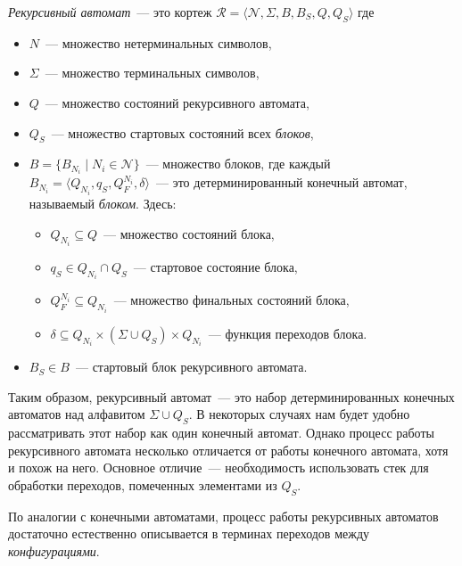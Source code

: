 \begin{definition}
    \emph{Рекурсивный автомат}~--- это кортеж $\mathcal{R} = \langle \mathcal{N},\Sigma,B,B_S,Q,Q_S\rangle$ где
    \begin{itemize}
        \item $N$~--- множество нетерминальных символов,
        \item $\Sigma$~--- множество терминальных символов,
        \item $Q$~--- множество состояний рекурсивного автомата,
        \item $Q_S$~--- множество стартовых состояний всех \emph{блоков},
        \item $B=\{B_{N_i} \mid N_i \in \mathcal{N}\}$~--- множество блоков, где каждый \\ $B_{N_i} = \langle Q_{N_i}, q_S, Q_F^{N_i}, \delta \rangle$~--- это детерминированный конечный автомат, называемый \emph{блоком}.
              Здесь:
              \begin{itemize}
                  \item $Q_{N_i} \subseteq Q$~--- множество состояний блока,
                  \item $q_S \in Q_{N_i} \cap Q_S$~--- стартовое состояние блока,
                  \item $Q_F^{N_i} \subseteq Q_{N_i}$~--- множество финальных состояний блока,
                  \item $\delta \subseteq Q_{N_i} \times  (\Sigma\cup Q_S) \times Q_{N_i}$~--- функция переходов блока.
              \end{itemize}
        \item $B_S \in B$~--- стартовый блок рекурсивного автомата.
    \end{itemize}
\end{definition}

Таким образом, рекурсивный автомат~--- это набор детерминированных конечных автоматов над алфавитом $\Sigma \cup Q_S$.
В некоторых случаях нам будет удобно рассматривать этот набор как один конечный автомат.
Однако процесс работы рекурсивного автомата несколько отличается от работы конечного автомата, хотя и похож на него.
Основное отличие~--- необходимость использовать стек для обработки переходов, помеченных элементами из $Q_S$.

По аналогии с конечными автоматами, процесс работы рекурсивных автоматов достаточно естественно описывается в терминах переходов между \emph{конфигурациями}.

